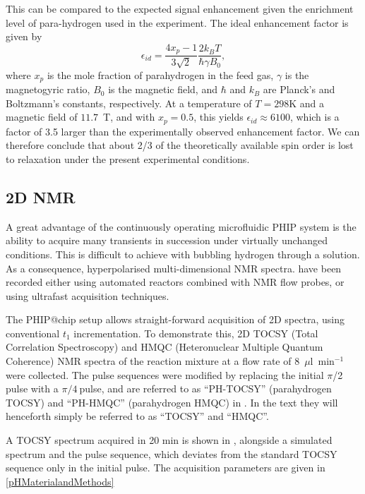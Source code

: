 This can be compared to the expected signal enhancement given the enrichment
level of para-hydrogen used in the experiment. The ideal enhancement factor is
given by
\begin{equation}
	\epsilon_{id} =\frac{4x_p-1}{3\sqrt{2}} \frac{2 k_BT}{\hbar \gamma B_0},
\end{equation}
where $x_p$ is the mole fraction of parahydrogen in the feed gas, $\gamma$ is
the magnetogyric ratio, $B_0$ is the magnetic field, and $\hbar$ and $k_B$ are
Planck's and Boltzmann's constants, respectively.  At a temperature of $T=298$K
and a magnetic field of $11.7$~T, and with $x_p=0.5$, this yields
$\epsilon_{id}\approx 6100$, which is a factor of 3.5 larger than the
experimentally observed enhancement factor. We can therefore conclude that
about 2/3 of the theoretically available spin order is lost to relaxation under
the present experimental conditions.

\subsection{2D NMR}

A great advantage of the continuously operating microfluidic PHIP system is the
ability to acquire many transients in succession under virtually unchanged
conditions.
This is difficult to achieve with bubbling hydrogen through a solution.
As a consequence, hyperpolarised multi-dimensional NMR spectra\cite{Mishkovsky:2008cl,Giraudeau:2009fn,Roth:2010hk,Lloyd:2012cf,Eshuis:2015ce,Kiryutin:2019hy}. have been recorded
either using automated reactors combined with NMR flow probes,\cite{Lloyd:2012cf,Eshuis:2015ce}
or using ultrafast acquisition techniques\cite{Mishkovsky:2008cl,Giraudeau:2009fn,Kiryutin:2019hy}.

The PHIP@chip setup allows straight-forward acquisition of 2D spectra, using
conventional $t_1$ incrementation.
To demonstrate this, 2D TOCSY (Total Correlation
Spectroscopy) and HMQC (Heteronuclear Multiple Quantum Coherence) NMR spectra
of the reaction mixture at a flow rate of 8~$\mu$l~min$^{-1}$ were collected. The
pulse sequences were modified by replacing the initial \(\pi\)/2 pulse with a
\(\pi/4\ \)pulse, and are referred to as ``PH-TOCSY'' (parahydrogen TOCSY) and
``PH-HMQC'' (parahydrogen HMQC) in .  In the text they will
henceforth simply be referred to as ``TOCSY'' and ``HMQC''.

A TOCSY spectrum acquired in 20 min is shown in , alongside
a simulated spectrum and the pulse sequence, which deviates from the standard
TOCSY sequence only in the initial pulse. The acquisition parameters are given
in \ref{pHMaterialandMethods}

